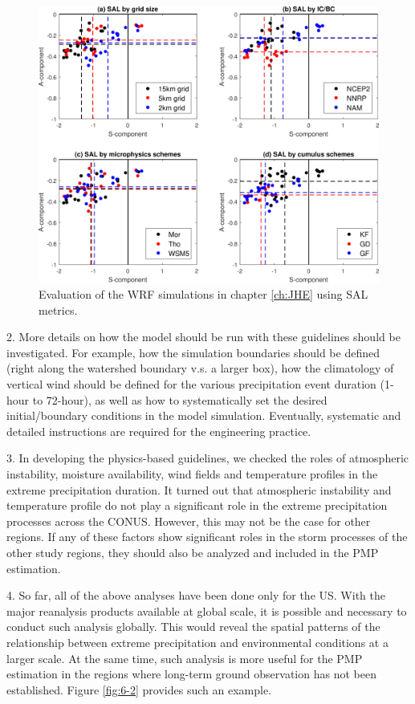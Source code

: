 \begin{figure}[htbp]
	\centering
	\includegraphics[width=\linewidth]{pics/ch6/fig1.jpg}
	\caption{Evaluation of the WRF simulations in chapter \ref{ch:JHE} using SAL metrics.}
	\label{fig:6-1}
\end{figure}

2. More details on how the model should be run with these guidelines should be investigated. For example, how the simulation boundaries should be defined (right along the watershed boundary v.s. a larger box), how the climatology of vertical wind should be defined for the various precipitation event duration (1-hour to 72-hour), as well as how to systematically set the desired initial/boundary conditions in the model simulation. Eventually, systematic and detailed instructions are required for the engineering practice.

3. In developing the physics-based guidelines, we checked the roles of atmospheric instability, moisture availability, wind fields and temperature profiles in the extreme precipitation duration. It turned out that atmospheric instability and temperature profile do not play a significant role in the extreme precipitation processes across the CONUS. However, this may not be the case for other regions. If any of these factors show significant roles in the storm processes of the other study regions, they should also be analyzed and included in the PMP estimation.

4. So far, all of the above analyses have been done only for the US. With the major reanalysis products available at global scale, it is possible and necessary to conduct such analysis globally. This would reveal the spatial patterns of the relationship between extreme precipitation and environmental conditions at a larger scale. At the same time, such analysis is more useful for the PMP estimation in the regions where long-term ground observation has not been established. Figure \ref{fig:6-2} provides such an example.

